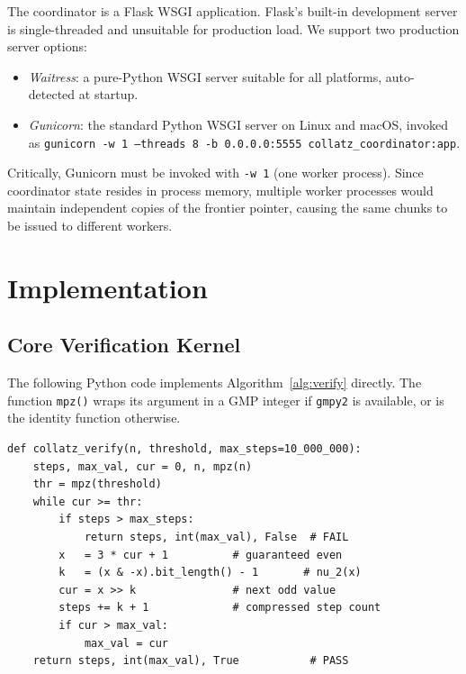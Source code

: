 \documentclass{mcom-l}
\theoremstyle{definition}
\theoremstyle{remark}
\numberwithin{equation}{section}
\begin{document}
The coordinator is a Flask WSGI application.  Flask's built-in
development server is single-threaded and unsuitable for production
load.  We support two production server options:
\begin{itemize}
  \item \emph{Waitress}: a pure-Python WSGI server \cite{Waitress}
        suitable for all platforms, auto-detected at startup.
  \item \emph{Gunicorn}: the standard Python WSGI server on Linux and
        macOS, invoked as
        \texttt{gunicorn -w 1 --threads 8 -b 0.0.0.0:5555
        collatz\_coordinator:app}.
\end{itemize}
Critically, Gunicorn must be invoked with \texttt{-w 1} (one worker
process).  Since coordinator state resides in process memory, multiple
worker processes would maintain independent copies of the frontier
pointer, causing the same chunks to be issued to different workers.

\section{Implementation}
\label{sec:implementation}

\subsection{Core Verification Kernel}

The following Python code implements Algorithm~\ref{alg:verify}
directly.  The function \texttt{mpz()} wraps its argument in a GMP
integer if \texttt{gmpy2} is available, or is the identity function
otherwise.

\begin{lstlisting}[caption={Core verification kernel (Python 3).},
                   label={lst:kernel}]
def collatz_verify(n, threshold, max_steps=10_000_000):
    steps, max_val, cur = 0, n, mpz(n)
    thr = mpz(threshold)
    while cur >= thr:
        if steps > max_steps:
            return steps, int(max_val), False  # FAIL
        x   = 3 * cur + 1          # guaranteed even
        k   = (x & -x).bit_length() - 1       # nu_2(x)
        cur = x >> k               # next odd value
        steps += k + 1             # compressed step count
        if cur > max_val:
            max_val = cur
    return steps, int(max_val), True           # PASS
\end{lstlisting}
\end{document}
